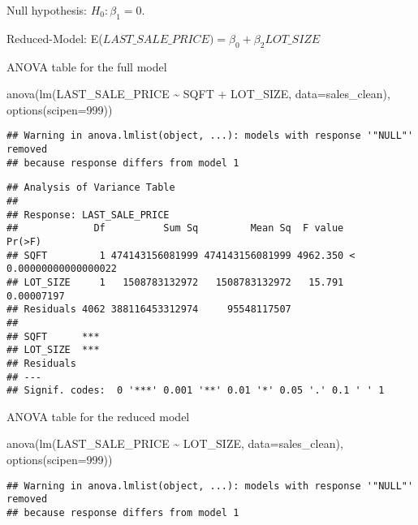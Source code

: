 \documentclass[
]{article}
\newenvironment{Shaded}{\begin{snugshade}}{\end{snugshade}}
\newcommand{\AttributeTok}[1]{\textcolor[rgb]{0.77,0.63,0.00}{#1}}
\newcommand{\DecValTok}[1]{\textcolor[rgb]{0.00,0.00,0.81}{#1}}
\newcommand{\FunctionTok}[1]{\textcolor[rgb]{0.00,0.00,0.00}{#1}}
\newcommand{\NormalTok}[1]{#1}
\newcommand{\SpecialCharTok}[1]{\textcolor[rgb]{0.00,0.00,0.00}{#1}}
\begin{document}
Null hypothesis: \(H_0:\beta_1=0\).

Reduced-Model: E(\(LAST\_SALE\_PRICE)=\beta_0 + \beta_2 LOT\_SIZE\)

ANOVA table for the full model

\begin{Shaded}
\begin{Highlighting}[]
\FunctionTok{anova}\NormalTok{(}\FunctionTok{lm}\NormalTok{(LAST\_SALE\_PRICE }\SpecialCharTok{\textasciitilde{}}\NormalTok{ SQFT }\SpecialCharTok{+}\NormalTok{ LOT\_SIZE, }\AttributeTok{data=}\NormalTok{sales\_clean), }\FunctionTok{options}\NormalTok{(}\AttributeTok{scipen=}\DecValTok{999}\NormalTok{))}
\end{Highlighting}
\end{Shaded}

\begin{verbatim}
## Warning in anova.lmlist(object, ...): models with response '"NULL"' removed
## because response differs from model 1
\end{verbatim}

\begin{verbatim}
## Analysis of Variance Table
## 
## Response: LAST_SALE_PRICE
##             Df          Sum Sq         Mean Sq  F value                Pr(>F)
## SQFT         1 474143156081999 474143156081999 4962.350 < 0.00000000000000022
## LOT_SIZE     1   1508783132972   1508783132972   15.791            0.00007197
## Residuals 4062 388116453312974     95548117507                               
##              
## SQFT      ***
## LOT_SIZE  ***
## Residuals    
## ---
## Signif. codes:  0 '***' 0.001 '**' 0.01 '*' 0.05 '.' 0.1 ' ' 1
\end{verbatim}

ANOVA table for the reduced model

\begin{Shaded}
\begin{Highlighting}[]
\FunctionTok{anova}\NormalTok{(}\FunctionTok{lm}\NormalTok{(LAST\_SALE\_PRICE }\SpecialCharTok{\textasciitilde{}}\NormalTok{ LOT\_SIZE, }\AttributeTok{data=}\NormalTok{sales\_clean), }\FunctionTok{options}\NormalTok{(}\AttributeTok{scipen=}\DecValTok{999}\NormalTok{))}
\end{Highlighting}
\end{Shaded}

\begin{verbatim}
## Warning in anova.lmlist(object, ...): models with response '"NULL"' removed
## because response differs from model 1
\end{verbatim}
\end{document}
